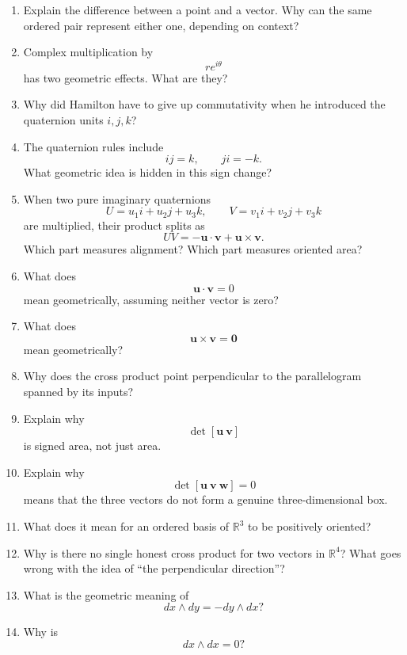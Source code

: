 \begin{enumerate}
\item Explain the difference between a point and a vector.  Why can the same ordered
pair represent either one, depending on context?

\item Complex multiplication by
\[
    re^{i\theta}
\]
has two geometric effects.  What are they?

\item Why did Hamilton have to give up commutativity when he introduced the quaternion
units \(i,j,k\)?

\item The quaternion rules include
\[
    ij=k,
    \qquad
    ji=-k.
\]
What geometric idea is hidden in this sign change?

\item When two pure imaginary quaternions
\[
    U=u_1i+u_2j+u_3k,
    \qquad
    V=v_1i+v_2j+v_3k
\]
are multiplied, their product splits as
\[
    UV=-\mathbf u\cdot\mathbf v+\mathbf u\times\mathbf v.
\]
Which part measures alignment?  Which part measures oriented area?

\item What does
\[
    \mathbf u\cdot\mathbf v=0
\]
mean geometrically, assuming neither vector is zero?

\item What does
\[
    \mathbf u\times\mathbf v=\mathbf 0
\]
mean geometrically?

\item Why does the cross product point perpendicular to the parallelogram spanned by
its inputs?

\item Explain why
\[
    \det[\mathbf u\ \mathbf v]
\]
is signed area, not just area.

\item Explain why
\[
    \det[\mathbf u\ \mathbf v\ \mathbf w]=0
\]
means that the three vectors do not form a genuine three-dimensional box.

\item What does it mean for an ordered basis of \(\mathbb R^3\) to be positively
oriented?

\item Why is there no single honest cross product for two vectors in \(\mathbb R^4\)?
What goes wrong with the idea of ``the perpendicular direction''?

\item What is the geometric meaning of
\[
    dx\wedge dy=-dy\wedge dx?
\]

\item Why is
\[
    dx\wedge dx=0?
\]
\end{enumerate}

